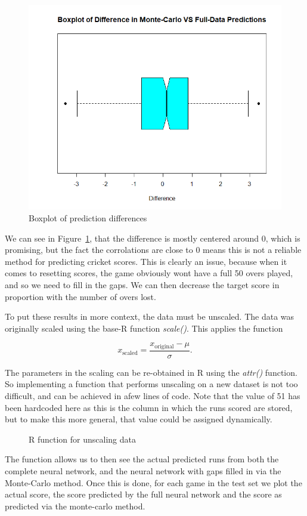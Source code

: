 \begin{figure}[h]
    \centering
    \includegraphics[width=0.4\linewidth]{figures/diffbox.png}
    \caption{Boxplot of prediction differences}
    \label{diffbox}
\end{figure}

We can see in Figure~\ref{diffbox}, that the difference is mostly centered around 0, which is promising, but the fact the corrolations are close to 0 means this is not a reliable method for predicting 
cricket scores. This is clearly an issue, because when it comes to resetting scores, the game obviously wont have a full 50 overs played, and so we need to fill in the gaps. We can then decrease the target score in proportion 
with the number of overs lost.

To put these results in more context, the data must be unscaled. The data was originally scaled using the base-R function \textit{scale()}. This applies the function

\[
    x_{\text{scaled}} = \frac{x_{\text{original}}-\mu}{\sigma}.    
\]

The parameters in the scaling can be re-obtained in R using the \textit{attr()} function. So implementing a function that 
performs unscaling on a new dataset is not too difficult, and can be achieved in afew lines of code. Note that the value of 51 has been hardcoded 
here as this is the column in which the runs scored are stored, but to make this more general, that value could be assigned dynamically.

\begin{figure}[h]
    
    \caption{R function for unscaling data}
    \label{unscale}
\end{figure}

The function allows us to then see the actual predicted runs from both the complete neural network, and the neural network with 
gaps filled in via the Monte-Carlo method. Once this is done, for each game in the test set we plot the actual score, the score predicted by the full neural network and 
the score as predicted via the monte-carlo method. \\ 

